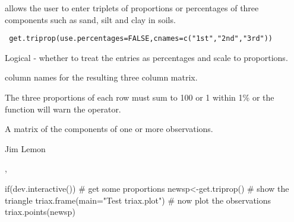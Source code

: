 \begin{Description}\relax
{} allows the user to enter triplets of proportions
or percentages of three components such as sand, silt and clay in soils.
\end{Description}
\begin{Usage}
\begin{verbatim}
 get.triprop(use.percentages=FALSE,cnames=c("1st","2nd","3rd"))
\end{verbatim}
\end{Usage}
\begin{Arguments}
\begin{ldescription}
\item[\code{use.percentages}] Logical - whether to treat the entries as
percentages and scale to proportions.
\item[\code{cnames}] column names for the resulting three column matrix.
\end{ldescription}
\end{Arguments}
\begin{Details}\relax
The three proportions of each row must sum to 100 or 1 within 1\% or
the function will warn the operator.
\end{Details}
\begin{Value}
A matrix of the components of one or more observations.
\end{Value}
\begin{Author}\relax
Jim Lemon
\end{Author}
\begin{SeeAlso}\relax
{}, 
\end{SeeAlso}
\begin{Examples}
\begin{ExampleCode}
 if(dev.interactive()) {
  # get some proportions
  newsp<-get.triprop()
  # show the triangle
  triax.frame(main="Test triax.plot")
  # now plot the observations
  triax.points(newsp)
 }
\end{ExampleCode}
\end{Examples}

